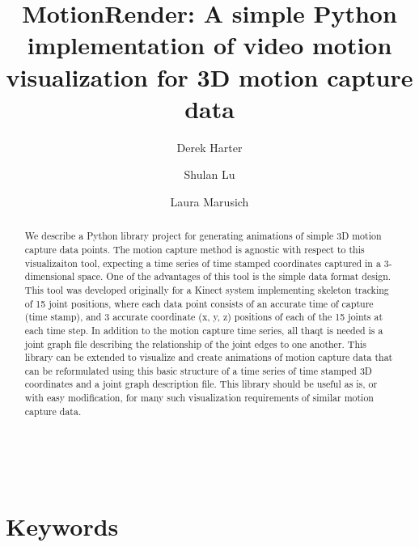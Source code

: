 \documentclass[10pt,a4paper]{article}
\begin{document}
\pagestyle{fancy}

\title{MotionRender: A simple Python implementation of video motion visualization for 3D motion capture data}
\author[1]{Derek Harter}
\author[2]{Shulan Lu}
\author[3]{Laura Marusich}
  
\maketitle
\thispagestyle{fancy}

\phantom{abstract is indented if this text is missing}
\\
\begin{abstract}

We describe a Python library project for generating animations of
simple 3D motion capture data points.  The motion capture method is
agnostic with respect to this visualizaiton tool, expecting a time
series of time stamped coordinates captured in a 3-dimensional space.
One of the advantages of this tool is the simple data format design.
This tool was developed originally for a Kinect system implementing
skeleton tracking of 15 joint positions, where each data point
consists of an accurate time of capture (time stamp), and 3 accurate
coordinate (x, y, z) positions of each of the 15 joints at each time
step.  In addition to the motion capture time series, all thaqt is
needed is a joint graph file describing the relationship of the joint
edges to one another.  This library can be extended to visualize and
create animations of motion capture data that can be reformulated
using this basic structure of a time series of time stamped 3D
coordinates and a joint graph description file.  This library should
be useful as is, or with easy modification, for many such
visualization requirements of similar motion capture data.
  

\end{abstract}

\section*{\color{f1ROrange}Keywords}
\end{document}

